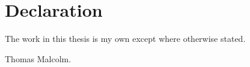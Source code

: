 
\chapter*{Declaration}\label{declaration}
\thispagestyle{empty}
The work in this thesis is my own except where otherwise stated.

\vspace{1in}


\hfill\hfill\hfill
%
Thomas Malcolm.
%
\hspace*{\fill}
